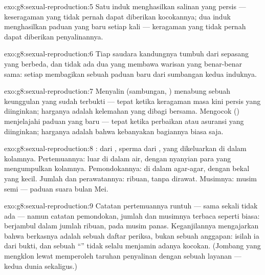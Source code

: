 \begin{solution}{exo:g8:sexual-reproduction:5}
Satu induk menghasilkan salinan yang persis --- keseragaman yang tidak
pernah dapat diberikan kocokannya; dua induk menghasilkan paduan yang
baru setiap kali --- keragaman yang tidak pernah dapat diberikan
penyalinannya.
\end{solution}

\begin{solution}{exo:g8:sexual-reproduction:6}
Tiap saudara kandungnya tumbuh dari sepasang  yang berbeda, dan
tidak ada dua  yang membawa warisan yang benar-benar sama: setiap
 membagikan sebuah paduan baru dari sumbangan kedua induknya.
\end{solution}

\begin{solution}{exo:g8:sexual-reproduction:7}
Menyalin (sambungan, ) menabung sebuah keunggulan yang sudah
terbukti --- tepat ketika keragaman masa kini persis yang diinginkan;
harganya adalah kelemahan yang dibagi bersama. Mengocok ()
menjelajahi paduan yang baru --- tepat ketika perbaikan atau asuransi
yang diinginkan; harganya adalah bahwa kebanyakan bagiannya biasa
saja.
\end{solution}

\begin{solution}{exo:g8:sexual-reproduction:8}
:  dari , sperma dari , yang
dikeluarkan di dalam kolamnya. Pertemuannya:  luar di dalam
air, dengan nyanyian para  yang mengumpulkan kolamnya.
Pemondokannya:  di dalam agar-agar, dengan bekal yang kecil.
Jumlah dan perawatannya: ribuan, tanpa dirawat. Musimnya: musim semi
--- paduan suara bulan Mei.
\end{solution}

\begin{solution}{exo:g8:sexual-reproduction:9}
Catatan pertemuannya runtuh --- sama sekali tidak ada  ---
namun catatan pemondokan, jumlah dan musimnya terbaca seperti biasa:
 berjambul dalam jumlah ribuan, pada musim panas. Keganjilannya
mengajarkan bahwa berkasnya adalah sebuah daftar periksa, bukan sebuah
anggapan: isilah ia dari bukti, dan sebuah ``'' tidak selalu
menjamin adanya kocokan. (Jombang yang mengklon lewat  memperoleh
taruhan penyalinan dengan sebuah layanan  --- kedua dunia
sekaligus.)
\end{solution}

